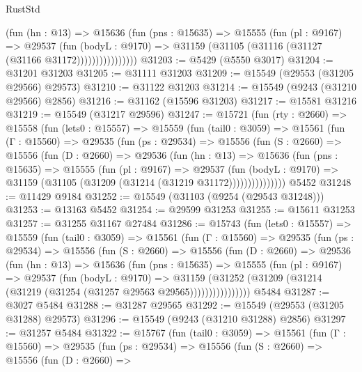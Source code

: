 \begin{lexlean}{RustStd}
\begin{coremodule}
                    (fun (hn : @13) =>
                    @15636
                      (fun (pns : @15635) =>
                      @15555
                        (fun (pl : @9167) =>
                        @29537
                          (fun (bodyL : @9170) =>
                          @31159 (@31105 (@31116 (@31127 (@31166 @31172))))))))))))))))
@31203 := @5429 (@5550 @3017)
@31204 := @31201 @31203
@31205 := @31111 @31203
@31209 := @15549 (@29553 (@31205 @29566) @29573)
@31210 := @31122 @31203
@31214 := @15549 (@9243 (@31210 @29566) @2856)
@31216 := @31162 (@15596 @31203)
@31217 := @15581 @31216
@31219 := @15549 (@31217 @29596)
@31247 := @15721
    (fun (rty : @2660) =>
    @15558
      (fun (lets0 : @15557) =>
      @15559
        (fun (tail0 : @3059) =>
        @15561
          (fun (Γ : @15560) =>
          @29535
            (fun (ps : @29534) =>
            @15556
              (fun (S : @2660) =>
              @15556
                (fun (D : @2660) =>
                @29536
                  (fun (hn : @13) =>
                  @15636
                    (fun (pns : @15635) =>
                    @15555
                      (fun (pl : @9167) =>
                      @29537
                        (fun (bodyL : @9170) =>
                        @31159 (@31105 (@31209 (@31214 (@31219 @31172)))))))))))))))
    @5452
@31248 := @11429 @9184
@31252 := @15549 (@31103 (@9254 (@29543 @31248)))
@31253 := @13163 @5452
@31254 := @29599 @31253
@31255 := @15611 @31253
@31257 := @31255 @31167 @27484
@31286 := @15743
    (fun (lets0 : @15557) =>
    @15559
      (fun (tail0 : @3059) =>
      @15561
        (fun (Γ : @15560) =>
        @29535
          (fun (ps : @29534) =>
          @15556
            (fun (S : @2660) =>
            @15556
              (fun (D : @2660) =>
              @29536
                (fun (hn : @13) =>
                @15636
                  (fun (pns : @15635) =>
                  @15555
                    (fun (pl : @9167) =>
                    @29537
                      (fun (bodyL : @9170) =>
                      @31159
                        (@31252
                          (@31209 (@31214 (@31219 (@31254 (@31257 @29563 @29565))))))))))))))))
    @5484
@31287 := @3027 @5484
@31288 := @31287 @29565
@31292 := @15549 (@29553 (@31205 @31288) @29573)
@31296 := @15549 (@9243 (@31210 @31288) @2856)
@31297 := @31257 @5484
@31322 := @15767
    (fun (tail0 : @3059) =>
    @15561
      (fun (Γ : @15560) =>
      @29535
        (fun (ps : @29534) =>
        @15556
          (fun (S : @2660) =>
          @15556
            (fun (D : @2660) =>

\end{coremodule}
\end{lexlean}
